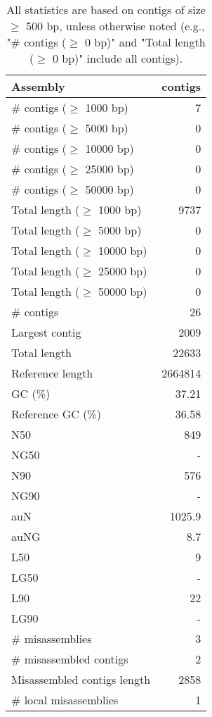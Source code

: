 \documentclass[12pt,a4paper]{article}
\begin{document}
\begin{table}[ht]
\begin{center}
\caption{All statistics are based on contigs of size $\geq$ 500 bp, unless otherwise noted (e.g., "\# contigs ($\geq$ 0 bp)" and "Total length ($\geq$ 0 bp)" include all contigs).}
\begin{tabular}{|l*{1}{|r}|}
\hline
Assembly & contigs \\ \hline
\# contigs ($\geq$ 1000 bp) & 7 \\ \hline
\# contigs ($\geq$ 5000 bp) & 0 \\ \hline
\# contigs ($\geq$ 10000 bp) & 0 \\ \hline
\# contigs ($\geq$ 25000 bp) & 0 \\ \hline
\# contigs ($\geq$ 50000 bp) & 0 \\ \hline
Total length ($\geq$ 1000 bp) & 9737 \\ \hline
Total length ($\geq$ 5000 bp) & 0 \\ \hline
Total length ($\geq$ 10000 bp) & 0 \\ \hline
Total length ($\geq$ 25000 bp) & 0 \\ \hline
Total length ($\geq$ 50000 bp) & 0 \\ \hline
\# contigs & 26 \\ \hline
Largest contig & 2009 \\ \hline
Total length & 22633 \\ \hline
Reference length & 2664814 \\ \hline
GC (\%) & 37.21 \\ \hline
Reference GC (\%) & 36.58 \\ \hline
N50 & 849 \\ \hline
NG50 & - \\ \hline
N90 & 576 \\ \hline
NG90 & - \\ \hline
auN & 1025.9 \\ \hline
auNG & 8.7 \\ \hline
L50 & 9 \\ \hline
LG50 & - \\ \hline
L90 & 22 \\ \hline
LG90 & - \\ \hline
\# misassemblies & 3 \\ \hline
\# misassembled contigs & 2 \\ \hline
Misassembled contigs length & 2858 \\ \hline
\# local misassemblies & 1 \\ \hline

\end{tabular}
\end{center}
\end{table}
\end{document}
